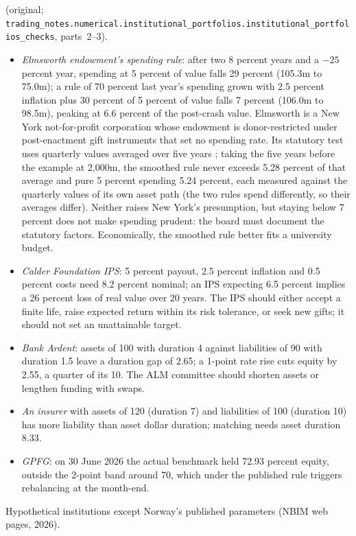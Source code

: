 \begin{qfmethod}
 (original; \nolinkurl{trading_notes.numerical.institutional_portfolios.institutional_portfolios_checks}, parts~2--3).
\begin{itemize}
\item \emph{Elmsworth endowment's spending rule}: after two 8 percent years and a $-25$ percent year, spending at 5 percent of value falls 29 percent (105.3m to 75.0m); a rule of 70 percent last year's spending grown with 2.5 percent inflation plus 30 percent of 5 percent of value falls 7 percent (106.0m to 98.5m), peaking at 6.6 percent of the post-crash value. Elmsworth is a New York not-for-profit corporation whose endowment is donor-restricted under post-enactment gift instruments that set no spending rate. Its statutory test uses quarterly values averaged over five years \citep[sec.~553(d)]{ny-npc-553}; taking the five years before the example at 2,000m, the smoothed rule never exceeds 5.28 percent of that average and pure 5 percent spending 5.24 percent, each measured against the quarterly values of its own asset path (the two rules spend differently, so their averages differ). Neither raises New York's presumption, but staying below 7 percent does not make spending prudent: the board must document the statutory factors. Economically, the smoothed rule better fits a university budget.
\item \emph{Calder Foundation IPS}: 5 percent payout, 2.5 percent inflation and 0.5 percent costs need 8.2 percent nominal; an IPS expecting 6.5 percent implies a 26 percent loss of real value over 20 years. The IPS should either accept a finite life, raise expected return within its risk tolerance, or seek new gifts; it should not set an unattainable target.
\item \emph{Bank Ardent}: assets of 100 with duration 4 against liabilities of 90 with duration 1.5 leave a duration gap of 2.65; a 1-point rate rise cuts equity by 2.55, a quarter of its 10. The ALM committee should shorten assets or lengthen funding with swaps.
\item \emph{An insurer} with assets of 120 (duration 7) and liabilities of 100 (duration 10) has more liability than asset dollar duration; matching needs asset duration 8.33.
\item \emph{GPFG}: on 30 June 2026 the actual benchmark held 72.93 percent equity, outside the 2-point band around 70, which under the published rule triggers rebalancing at the month-end.
\end{itemize}

 Hypothetical institutions except Norway's published parameters (NBIM web pages, 2026).


\end{qfmethod}
